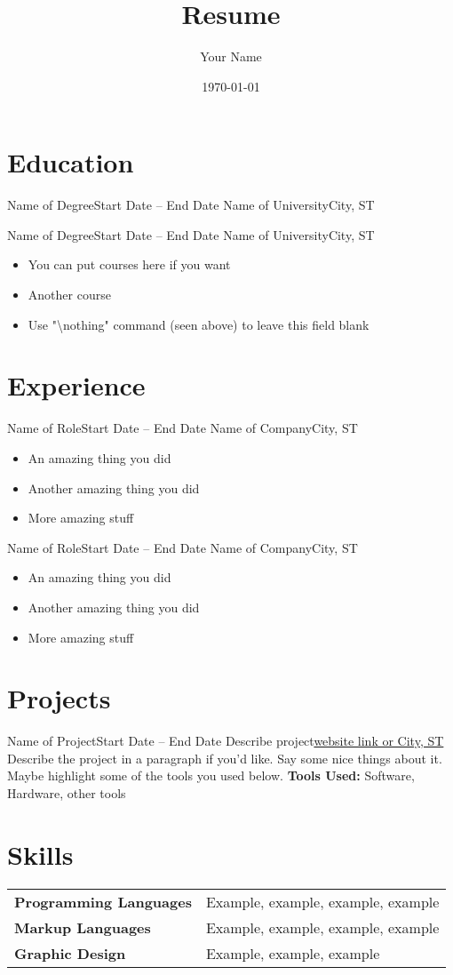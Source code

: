 \documentclass[english]{article}
\title{Resume}
\author{Your Name}
\date{\today}
\begin{document}
\sffamily %
\maketitle


\section{Education}

\entry
{Name of Degree}{Start Date -- End Date}
{Name of University}{City, ST}
{\nothing}

\entry
{Name of Degree}{Start Date -- End Date}
{Name of University}{City, ST}
{
\begin{itemize}
\item You can put courses here if you want
\item Another course
\item Use "\textbackslash nothing" command (seen above) to leave this field blank
\end{itemize}
}


\section{Experience}

\entry
{Name of Role}{Start Date -- End Date}
{Name of Company}{City, ST}
{
\begin{itemize}
\item An amazing thing you did
\item Another amazing thing you did
\item More amazing stuff
\end{itemize}
}

\entry
{Name of Role}{Start Date -- End Date}
{Name of Company}{City, ST}
{
\begin{itemize}
\item An amazing thing you did
\item Another amazing thing you did
\item More amazing stuff
\end{itemize}
}


\section{Projects}

\entry
{Name of Project}{Start Date -- End Date}
{Describe project}{\href{link_to_project.com}{website link or City, ST}}
{
Describe the project in a paragraph if you'd like.
Say some nice things about it.
Maybe highlight some of the tools you used below.
\textbf{Tools Used:} Software, Hardware, other tools
}


\section{Skills}

\begin{tabular}{ll}
\textbf{Programming Languages} & Example, example, example, example \\
\textbf{Markup Languages} & Example, example, example, example \\
\textbf{Graphic Design} & Example, example, example 
\end{tabular}
\end{document}
